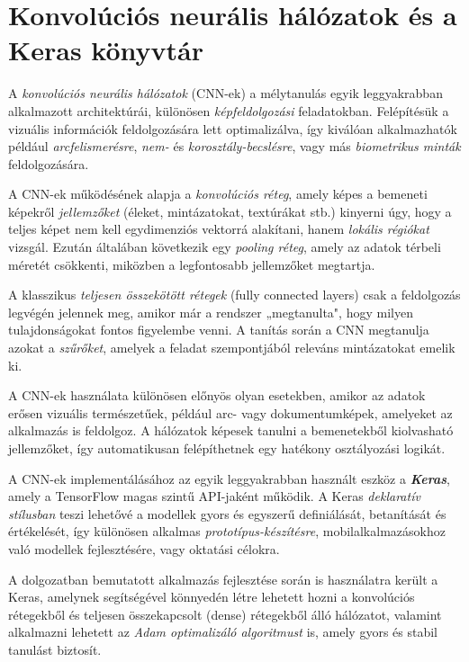\documentclass[
]{thesis-ekf}
\theoremstyle{definition}
\theoremstyle{remark}
\begin{document}
\section{Konvolúciós neurális hálózatok és a Keras könyvtár}
A \emph{konvolúciós neurális hálózatok} (CNN-ek) a mélytanulás egyik leggyakrabban alkalmazott architektúrái, különösen \emph{képfeldolgozási} feladatokban. Felépítésük a vizuális információk feldolgozására lett optimalizálva, így kiválóan alkalmazhatók például \emph{arcfelismerésre}, \emph{nem-} és \emph{korosztály-becslésre}, vagy más \emph{biometrikus minták} feldolgozására. \cite{cnnFoundations}

A CNN-ek működésének alapja a \emph{konvolúciós réteg}, amely képes a bemeneti képekről \emph{jellemzőket} (éleket, mintázatokat, textúrákat stb.) kinyerni úgy, hogy a teljes képet nem kell egydimenziós vektorrá alakítani, hanem \emph{lokális régiókat} vizsgál. Ezután általában következik egy \emph{pooling réteg}, amely az adatok térbeli méretét csökkenti, miközben a legfontosabb jellemzőket megtartja. \cite{deepLearningBook}

A klasszikus \emph{teljesen összekötött rétegek} (fully connected layers) csak a feldolgozás legvégén jelennek meg, amikor már a rendszer „megtanulta", hogy milyen tulajdonságokat fontos figyelembe venni. A tanítás során a CNN megtanulja azokat a \emph{szűrőket}, amelyek a feladat szempontjából releváns mintázatokat emelik ki. \cite{faceDetection}

A CNN-ek használata különösen előnyös olyan esetekben, amikor az adatok erősen vizuális természetűek, például arc- vagy dokumentumképek, amelyeket az alkalmazás is feldolgoz. A hálózatok képesek tanulni a bemenetekből kiolvasható jellemzőket, így automatikusan felépíthetnek egy hatékony osztályozási logikát. \cite{cvAndDL}

A CNN-ek implementálásához az egyik leggyakrabban használt eszköz a \textbf{\emph{Keras}}, amely a TensorFlow magas szintű API-jaként működik. A Keras \emph{deklaratív stílusban} teszi lehetővé a modellek gyors és egyszerű definiálását, betanítását és értékelését, így különösen alkalmas \emph{prototípus-készítésre}, mobilalkalmazásokhoz való modellek fejlesztésére, vagy oktatási célokra. \cite{kerasGuide}

A dolgozatban bemutatott alkalmazás fejlesztése során is használatra került a Keras, amelynek segítségével könnyedén létre lehetett hozni a konvolúciós rétegekből és teljesen összekapcsolt (dense) rétegekből álló hálózatot, valamint alkalmazni lehetett az \emph{Adam optimalizáló algoritmust} is, amely gyors és stabil tanulást biztosít. \cite{adamOptimizer}
\end{document}
